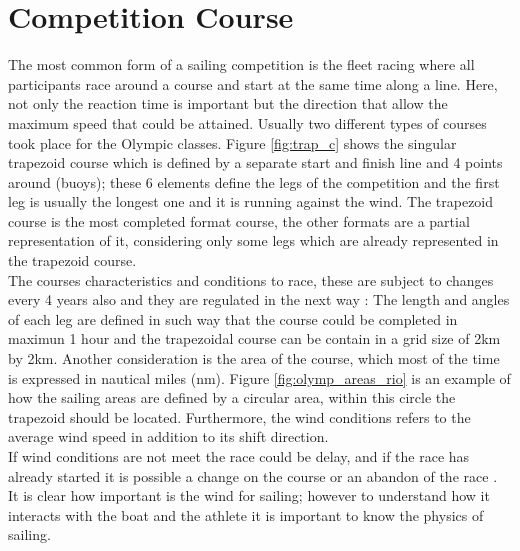 \section{Competition Course}\label{tracks}
The most common form of a sailing competition is the fleet racing where all participants race around a course and start at the same time along a line. Here, not only the reaction time is important but the direction that allow the maximum speed that could be attained. Usually two different types of courses took place for the Olympic classes. Figure \ref{fig:trap_c} shows the singular trapezoid course which is defined by a separate start and finish line and 4 points around (buoys); these 6 elements define the legs of the competition and the first leg is usually the longest one and it is running against the wind.
The trapezoid course is the most completed format course, the other formats are a partial representation of it, considering only some legs which are already represented in the trapezoid course.\\

The courses characteristics and conditions to race, these are subject to changes every 4 years also and they are regulated in the next way \cite{race_pol}: The length and angles of each leg are defined in such way that the course could be completed in maximun 1 hour and the trapezoidal course can be contain in a grid size of 2km by 2km.  Another consideration is the area of the course,  which most of the time is expressed in nautical miles (nm). Figure \ref{fig:olymp_areas_rio} is an example of how the sailing areas are defined by a circular area, within this circle the trapezoid should be located. Furthermore, the wind conditions refers to the average wind speed in addition to its shift direction.\\
If wind conditions are not meet the race could be delay, and if the race has already started it is possible a change on the course or an abandon of the race \cite{race_pol}. It is clear how important is the wind for sailing; however to understand how it interacts with the boat and the athlete it is important to know the physics of sailing. \\

